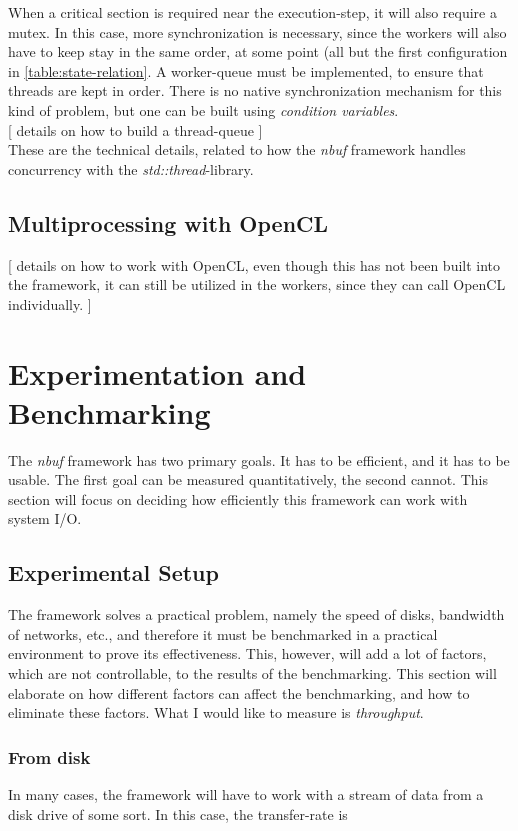 \documentclass[a4paper]{article}
\newcommand{\nbuf}{\textit{nbuf} }
\begin{document}
When a critical section is required near the execution-step, it will also require a mutex. In this case, more synchronization is necessary, since the workers will also have to keep stay in the same order, at some point (all but the first configuration in \autoref{table:state-relation}. A worker-queue must be implemented, to ensure that threads are kept in order. There is no native synchronization mechanism for this kind of problem, but one can be built using \textit{condition variables}.\\

[ details on how to build a thread-queue ]\\

These are the technical details, related to how the \nbuf framework handles concurrency with the \textit{std::thread}-library.


\subsection{Multiprocessing with OpenCL}
[ details on how to work with OpenCL, even though this has not been built into the framework, it can still be utilized in the workers, since they can call OpenCL individually. ]\\



\newpage
\section{Experimentation and Benchmarking}
The \nbuf framework has two primary goals. It has to be efficient, and it has to be usable. The first goal can be measured quantitatively, the second cannot. This section will focus on deciding how efficiently this framework can work with system I/O. 


\subsection{Experimental Setup}
The framework solves a practical problem, namely the speed of disks, bandwidth of networks, etc., and therefore it must be benchmarked in a practical environment to prove its effectiveness. This, however, will add a lot of factors, which are not controllable, to the results of the benchmarking. This section will elaborate on how different factors can affect the benchmarking, and how to eliminate these factors. What I would like to measure is \textit{throughput}.


\subsubsection{From disk}
In many cases, the framework will have to work with a stream of data from a disk drive of some sort. In this case, the transfer-rate is 
\end{document}
